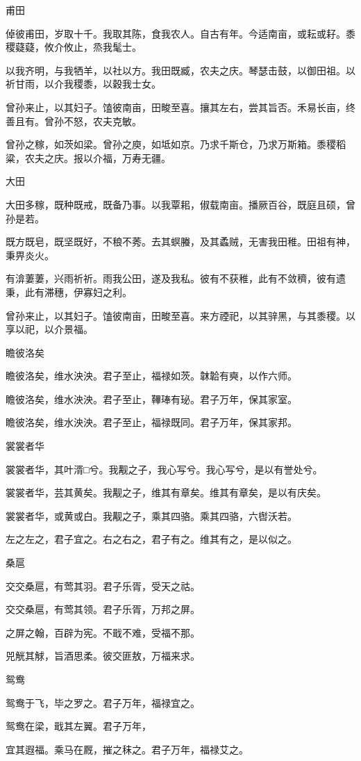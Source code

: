 甫田 

倬彼甫田，岁取十千。我取其陈，食我农人。自古有年。今适南亩，或耘或耔。黍稷薿薿，攸介攸止，烝我髦士。

以我齐明，与我牺羊，以社以方。我田既臧，农夫之庆。琴瑟击鼓，以御田祖。以祈甘雨，以介我稷黍，以穀我士女。

曾孙来止，以其妇子。馌彼南亩，田畯至喜。攘其左右，尝其旨否。禾易长亩，终善且有。曾孙不怒，农夫克敏。

曾孙之稼，如茨如梁。曾孙之庾，如坻如京。乃求千斯仓，乃求万斯箱。黍稷稻粱，农夫之庆。报以介福，万寿无疆。

大田

大田多稼，既种既戒，既备乃事。以我覃耜，俶载南亩。播厥百谷，既庭且硕，曾孙是若。

既方既皂，既坚既好，不稂不莠。去其螟螣，及其蟊贼，无害我田稚。田祖有神，秉畀炎火。

有渰萋萋，兴雨祈祈。雨我公田，遂及我私。彼有不获稚，此有不敛穧，彼有遗秉，此有滞穗，伊寡妇之利。

曾孙来止，以其妇子。馌彼南亩，田畯至喜。来方禋祀，以其骍黑，与其黍稷。以享以祀，以介景福。

瞻彼洛矣

瞻彼洛矣，维水泱泱。君子至止，福禄如茨。韎韐有奭，以作六师。

瞻彼洛矣，维水泱泱。君子至止，鞸琫有珌。君子万年，保其家室。

瞻彼洛矣，维水泱泱。君子至止，福禄既同。君子万年，保其家邦。

裳裳者华

裳裳者华，其叶湑□兮。我觏之子，我心写兮。我心写兮，是以有誉处兮。

裳裳者华，芸其黄矣。我觏之子，维其有章矣。维其有章矣，是以有庆矣。

裳裳者华，或黄或白。我觏之子，乘其四骆。乘其四骆，六辔沃若。

左之左之，君子宜之。右之右之，君子有之。维其有之，是以似之。

桑扈

交交桑扈，有莺其羽。君子乐胥，受天之祜。

交交桑扈，有莺其领。君子乐胥，万邦之屏。

之屏之翰，百辟为宪。不戢不难，受福不那。

兕觥其觩，旨酒思柔。彼交匪敖，万福来求。

鸳鸯

鸳鸯于飞，毕之罗之。君子万年，福禄宜之。

鸳鸯在梁，戢其左翼。君子万年，

宜其遐福。乘马在厩，摧之秣之。君子万年，福禄艾之。

